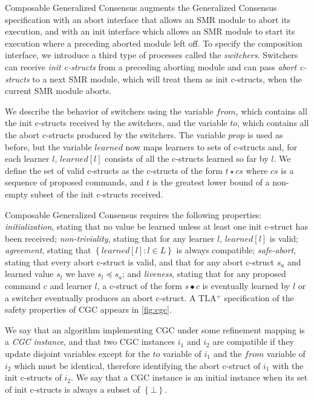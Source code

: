 Composable Generalized Consensus augments the Generalized Consensus specification with an abort interface that allows an SMR module to abort its execution, and with an init interface which allows an SMR module to start its execution where a preceding aborted module left off.
To specify the composition interface, we introduce a third type of processes called the \emph{switchers}. Switchers can receive \emph{init c-structs} from a preceding aborting module and can pass \emph{abort c-structs} to a next SMR module, which will treat them as init c-structs, when the current SMR module aborts.

We describe the behavior of switchers using the variable $from$, which contains all the init c-structs received by the switchers, and the variable $to$, which contains all the abort c-structs produced by the switchers.
The variable $prop$ is used as before, but the variable $learned$ now maps learners to sets of c-structs and, for each learner $l$, $learned\left[ l \right]$ consists of all the c-structs learned so far by $l$.
We define the set of valid c-structs as the c-structs of the form $t\star cs$ where $cs$ is a sequence of proposed commands, and $t$ is the greatest lower bound of a non-empty subset of the init c-structs received.

Composable Generalized Consensus requires the following properties: \emph{initialization}, stating that no value be learned unless at least one init c-struct has been received; \emph{non-triviality}, stating that for any learner $l$, $learned\left[ l \right]$ is valid; \emph{agreement}, stating that $\left\{ learned\left[ l \right] :  l \in L\right\}$ is always compatible; \emph{safe-abort}, stating that every abort c-struct is valid, and that for any abort c-struct $s_a$ and learned value $s_l$ we have
$s_l \preceq s_a$; and \emph{liveness}, stating that for any proposed command $c$ and learner $l$, a c-struct of the form $s\bullet c$ is eventually learned by $l$ or a switcher eventually produces an abort c-struct.
A TLA$^+$ specification of the safety properties of CGC appears in \cref{fig:cgc}.

We say that an algorithm implementing CGC under some refinement mapping is a \emph{CGC instance}, and that two CGC instances $i_1$ and $i_2$ are compatible if they update disjoint variables except for the $to$ variable of $i_1$ and the $from$ variable of $i_2$ which must be identical, therefore identifying the abort c-struct of $i_1$ with the init c-structs of $i_2$.
We say that a CGC instance is an initial instance when its set of init c-structs is always a subset of $\left\{ \bot \right\}$.   

